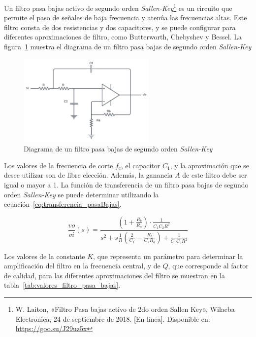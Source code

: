             Un filtro pasa bajas activo de segundo orden \textit{Sallen-Key}\footnote{W. Laiton, «Filtro Pasa bajas activo de 2do orden Sallen Key», Wilaeba Electronica, 24 de septiembre de 2018. [En línea]. Disponible en: \url{https://goo.su/J29uz5x}} es un circuito que permite el paso de señales de baja frecuencia y atenúa las frecuencias altas. Este filtro consta de dos resistencias y dos capacitores, y se puede configurar para diferentes aproximaciones de filtro, como Butterworth, Chebyshev y Bessel. La figura~\ref{fig:Filtro_Pasa_Bajas} muestra el diagrama de un filtro pasa bajas de segundo orden \textit{Sallen-Key}

            \begin{figure}[H]
                \centering
                \includegraphics[width=0.6\textwidth]{img/Marco/Filtro_pasa_bajas.png}
                \caption[Diagrama de un filtro pasa bajas de segundo orden \textit{Sallen-Key}.]{Diagrama de un filtro pasa bajas de segundo orden \textit{Sallen-Key}}
                \label{fig:Filtro_Pasa_Bajas}
            \end{figure}

            Los valores de la frecuencia de corte $f_c$, el capacitor $C_1$, y la aproximación que se desee utilizar son de libre elección. Además, la ganancia $A$ de este filtro debe ser igual o mayor a 1. La función de transferencia de un filtro pasa bajas de segundo orden \textit{Sallen-Key} se puede determinar utilizando la ecuación~\ref{eq:transferencia_pasaBajas}.

            \begin{equation}
                \label{eq:transferencia_pasaBajas}
                \frac{vo}{vi}(s) = \frac{(1+\frac{R_b}{R_a}) \cdot \frac{1}{C_1C_2R^2}}{s^2 + s\frac{1}{R}(\frac{2}{C_1} - \frac{R_b}{C_2R_a}) + \frac{1}{C_1C_2R^2}}
            \end{equation}

            Los valores de la constante $K$, que representa un parámetro para determinar la amplificación del filtro en la frecuencia central, y de $Q$, que corresponde al factor de calidad, para las diferentes aproximaciones del filtro se muestran en la tabla~\ref{tab:valores_filtro_pasa_bajas}.

